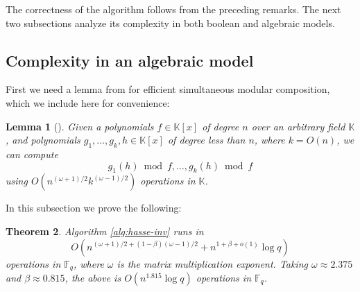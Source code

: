 \documentclass[12pt]{article}
\theoremstyle{plain}
\newtheorem{theorem}{Theorem}
\newtheorem{lemma}[theorem]{Lemma}
\theoremstyle{definition}
\def\F{\ensuremath{\mathbb{F}}}
\def\K{\ensuremath{\mathbb{K}}}
\begin{document}
 The correctness of the algorithm follows from the preceding remarks. The next two subsections 
 analyze its complexity in both boolean and algebraic models.
 

\subsection{Complexity in an algebraic model}

First we need a lemma from \cite{ks} for efficient simultaneous modular composition, which we 
include here for convenience:

\begin{lemma}[\cite{ks}]
	\label{lemma:ks}
	Given a polynomials $f \in \K[x]$ of degree $n$ over an arbitrary field $\K$, and polynomials 
	$g_1, \dots, g_k, h \in \K[x]$ of degree less than $n$, where $k = O(n)$, we can compute 
	\[ g_1(h) \bmod f, \dots, g_k(h) \bmod f \]
	using $O(n^{(\omega + 1) / 2} k^{(\omega - 1) / 2})$ operations in $\K$.
\end{lemma}

In this subsection we prove the following:

\begin{theorem}
	\label{theo:hasse-inv}
	Algorithm \ref{alg:hasse-inv} runs in
	\[O(n^{(\omega + 1) / 2 + (1 - \beta)(\omega - 1) / 2} + n^{1 + \beta + o(1)}\log q)\] 
	operations in $\F_q$, where $\omega$ is the matrix multiplication exponent. Taking $\omega 
	\approx	2.375$ and $\beta \approx 0.815$, the above is $O(n^{1.815}\log q)$ operations in 
	$\F_q$.
\end{theorem}
\end{document}

